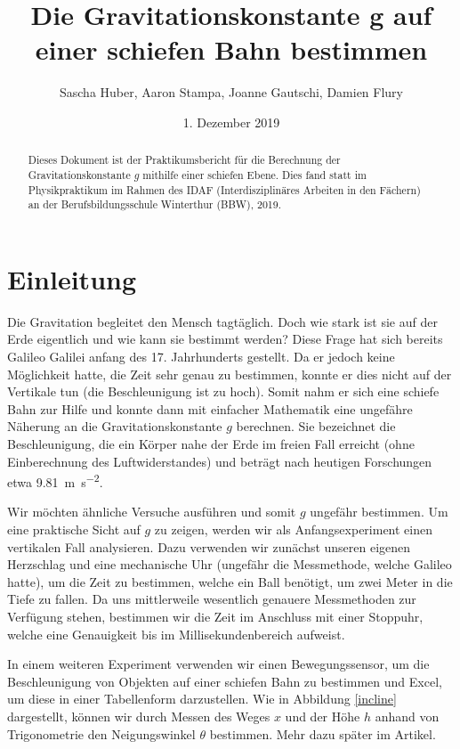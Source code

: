 \documentclass[a4paper, titlepage]{article}
\title{Die Gravitationskonstante g
auf einer schiefen Bahn bestimmen}
\author{Sascha Huber, Aaron Stampa, Joanne Gautschi, Damien Flury}
\date{1. Dezember 2019}
\newcommand{\accunit}[1]{\SI{#1}{\metre\per\square\second}}
\begin{document}
    \maketitle
    \begin{abstract}
       Dieses Dokument ist der Praktikumsbericht für die Berechnung
       der Gravitationskonstante $g$ mithilfe einer schiefen Ebene.
       Dies fand statt im Physikpraktikum im Rahmen des IDAF
       (Interdisziplinäres Arbeiten in den Fächern) an der
       Berufsbildungsschule Winterthur (BBW), 2019.
    \end{abstract}
    \tableofcontents
    \newpage
    \section{Einleitung}
    Die Gravitation begleitet den Mensch tagtäglich. Doch wie stark
    ist sie auf der Erde eigentlich und wie kann sie bestimmt werden?
    Diese Frage hat sich bereits Galileo Galilei anfang des 17. Jahrhunderts
    gestellt. Da er jedoch keine Möglichkeit hatte, die
    Zeit sehr genau zu bestimmen, konnte er dies nicht auf der
    Vertikale tun (die Beschleunigung ist zu hoch). Somit nahm er
    sich eine schiefe Bahn zur Hilfe und konnte dann mit einfacher
    Mathematik eine ungefähre Näherung an die Gravitationskonstante $g$
    berechnen. Sie bezeichnet die Beschleunigung, die ein Körper nahe
    der Erde im freien Fall erreicht (ohne Einberechnung des 
    Luftwiderstandes) und beträgt nach heutigen Forschungen
    etwa \accunit{9.81}.

    Wir möchten ähnliche Versuche ausführen und somit $g$ ungefähr bestimmen. 
    Um eine praktische Sicht auf $g$ zu zeigen, werden wir als Anfangsexperiment einen
    vertikalen Fall analysieren. Dazu verwenden wir zunächst unseren eigenen
    Herzschlag und eine mechanische Uhr (ungefähr die Messmethode, 
    welche Galileo hatte), um die Zeit zu bestimmen, welche ein Ball
    benötigt, um zwei Meter in die Tiefe zu fallen. Da uns mittlerweile
    wesentlich genauere Messmethoden zur Verfügung stehen, bestimmen wir
    die Zeit im Anschluss mit einer Stoppuhr, welche eine Genauigkeit bis im 
    Millisekundenbereich aufweist.
    
    In einem weiteren Experiment verwenden wir einen Bewegungssensor, um
    die Beschleunigung von Objekten auf einer schiefen Bahn zu bestimmen
    und Excel, um diese in einer Tabellenform darzustellen. Wie in 
    Abbildung \ref{incline} dargestellt, können wir durch Messen des
    Weges $x$ und der Höhe $h$ anhand von Trigonometrie den Neigungswinkel
    $\theta$ bestimmen. Mehr dazu später im Artikel.
\end{document}
